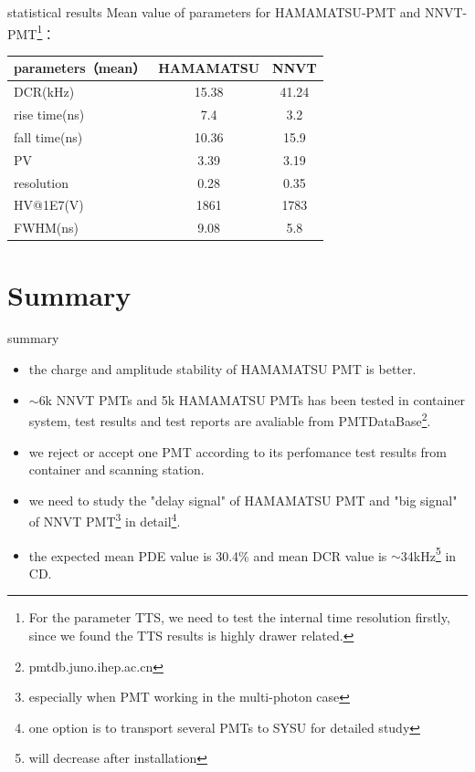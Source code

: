 \documentclass[11pt,compress,xcolor=x11names,UTF8]{beamer}
\begin{document}
\begin{frame}{statistical results}
Mean value of parameters for HAMAMATSU-PMT and NNVT-PMT\footnote{For the parameter TTS, we need to test the internal time resolution firstly, since we found the TTS results is highly drawer related.}：

\vspace{.5cm}

\centering
\begin{tabular}{l|c|c}
\hline
\hline
parameters（mean）&  {\color{Blue} HAMAMATSU} & {\color{Blue}NNVT} \\\hline
DCR(kHz)&15.38&41.24\\
rise time(ns)&7.4& 3.2\\
fall time(ns)&10.36& 15.9\\
PV&3.39& 3.19\\
resolution&0.28& 0.35\\
HV@1E7(V)&1861& 1783\\
FWHM(ns)&9.08& 5.8\\
\hline
\end{tabular}
\end{frame}
\section{Summary}
\begin{frame}{summary}
\begin{itemize}
\item  the charge and amplitude stability of HAMAMATSU PMT is better.
\item  $\sim$6k NNVT PMTs and 5k HAMAMATSU PMTs has been tested in container system, test results and test reports are avaliable from PMTDataBase\footnote{pmtdb.juno.ihep.ac.cn}.
\item we reject or accept one PMT according to its perfomance test results from container and scanning station.
\item  {\color{red}we need to study the "delay signal" of HAMAMATSU PMT and "big signal" of NNVT PMT\footnote{especially when PMT working in the multi-photon case}} in detail\footnote{one option is to transport several PMTs to SYSU for detailed study}.
\item the expected mean PDE value is 30.4\% and mean DCR value is $\sim$34kHz\footnote{will decrease after installation} in CD.
\end{itemize}
\end{frame}
\end{document}
